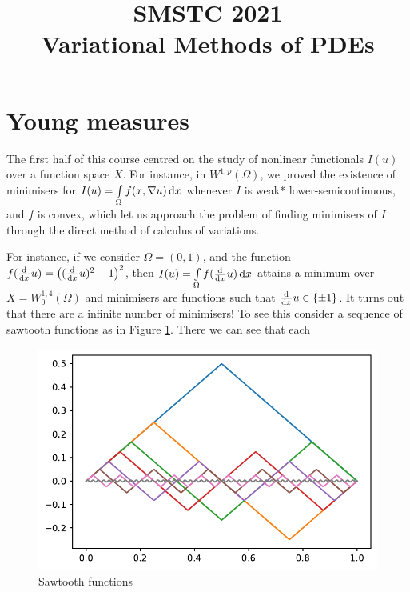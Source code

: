 \documentclass[a4paper,doc,11pt]{article}
\title{\bf
    \Large
    SMSTC 2021 
    \\
    Variational Methods of PDEs
}
\author{}%
\date{}
\begin{document}
\maketitle






\setcounter{section}{5}
\section{Young measures}


The first half of this course centred on the study of nonlinear functionals \(I(u)\) over a function space \(X\). For instance, in \(W^{1,p}(\Omega)\), we proved the existence of minimisers for \(I(u) = \int\limits_\Omega f(x,\nabla u)  \dif x\) whenever \(I\) is weak* lower-semicontinuous, and \(f\) is convex, which let us approach the problem of finding minimisers of \(I\) through the direct method of calculus of variations.

For instance, if we consider \( \Omega = (0,1)\), and the function \(f (\od{ }{x} u) = \big( (\od{ }{x} u)^2 -1 \big)^2\), then \(I(u) = \int\limits_\Omega f (\od{ }{x} u) \dif x\) attains a minimum over \(X = W^{1,4}_0(\Omega)\) and minimisers are functions such that \(\od{ }{x} u \in \{\pm 1\}\). It turns out that there are a infinite number of minimisers! To see this consider a sequence of sawtooth functions as in Figure \ref{fig:6a}. There we can see that each 

\begin{figure}
    \centering
    \includegraphics[scale=0.75]{Fig-6a.pdf}
    \caption{Sawtooth functions}
    \label{fig:6a}
\end{figure}
\end{document}
